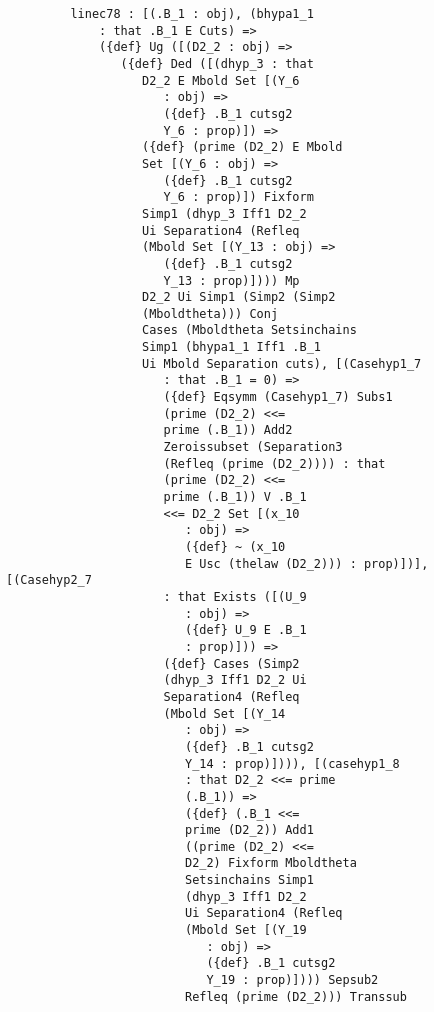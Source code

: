\documentclass[12pt]{article}
\begin{document}
\begin{verbatim}
         linec78 : [(.B_1 : obj), (bhypa1_1 
             : that .B_1 E Cuts) => 
             ({def} Ug ([(D2_2 : obj) => 
                ({def} Ded ([(dhyp_3 : that 
                   D2_2 E Mbold Set [(Y_6 
                      : obj) => 
                      ({def} .B_1 cutsg2 
                      Y_6 : prop)]) => 
                   ({def} (prime (D2_2) E Mbold 
                   Set [(Y_6 : obj) => 
                      ({def} .B_1 cutsg2 
                      Y_6 : prop)]) Fixform 
                   Simp1 (dhyp_3 Iff1 D2_2 
                   Ui Separation4 (Refleq 
                   (Mbold Set [(Y_13 : obj) => 
                      ({def} .B_1 cutsg2 
                      Y_13 : prop)]))) Mp 
                   D2_2 Ui Simp1 (Simp2 (Simp2 
                   (Mboldtheta))) Conj 
                   Cases (Mboldtheta Setsinchains 
                   Simp1 (bhypa1_1 Iff1 .B_1 
                   Ui Mbold Separation cuts), [(Casehyp1_7 
                      : that .B_1 = 0) => 
                      ({def} Eqsymm (Casehyp1_7) Subs1 
                      (prime (D2_2) <<= 
                      prime (.B_1)) Add2 
                      Zeroissubset (Separation3 
                      (Refleq (prime (D2_2)))) : that 
                      (prime (D2_2) <<= 
                      prime (.B_1)) V .B_1 
                      <<= D2_2 Set [(x_10 
                         : obj) => 
                         ({def} ~ (x_10 
                         E Usc (thelaw (D2_2))) : prop)])], [(Casehyp2_7 
                      : that Exists ([(U_9 
                         : obj) => 
                         ({def} U_9 E .B_1 
                         : prop)])) => 
                      ({def} Cases (Simp2 
                      (dhyp_3 Iff1 D2_2 Ui 
                      Separation4 (Refleq 
                      (Mbold Set [(Y_14 
                         : obj) => 
                         ({def} .B_1 cutsg2 
                         Y_14 : prop)]))), [(casehyp1_8 
                         : that D2_2 <<= prime 
                         (.B_1)) => 
                         ({def} (.B_1 <<= 
                         prime (D2_2)) Add1 
                         ((prime (D2_2) <<= 
                         D2_2) Fixform Mboldtheta 
                         Setsinchains Simp1 
                         (dhyp_3 Iff1 D2_2 
                         Ui Separation4 (Refleq 
                         (Mbold Set [(Y_19 
                            : obj) => 
                            ({def} .B_1 cutsg2 
                            Y_19 : prop)]))) Sepsub2 
                         Refleq (prime (D2_2))) Transsub 

\end{verbatim}
\end{document}
